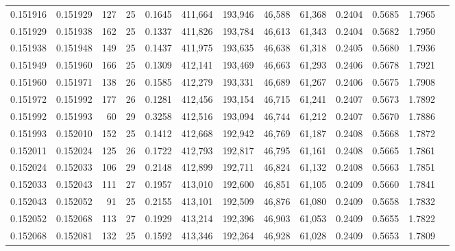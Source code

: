 \begin{tabular}{rrrrrrrrrrrrr}
0.151916 & 0.151929 & 127 &  25 &                                     0.1645 & 411,664 & 193,946 &  46,588 &  61,368 & 0.2404 & 0.5685 & 1.7965 \\
0.151929 & 0.151938 & 162 &  25 &                                     0.1337 & 411,826 & 193,784 &  46,613 &  61,343 & 0.2404 & 0.5682 & 1.7950 \\
0.151938 & 0.151948 & 149 &  25 &                                     0.1437 & 411,975 & 193,635 &  46,638 &  61,318 & 0.2405 & 0.5680 & 1.7936 \\
0.151949 & 0.151960 & 166 &  25 &                                     0.1309 & 412,141 & 193,469 &  46,663 &  61,293 & 0.2406 & 0.5678 & 1.7921 \\
0.151960 & 0.151971 & 138 &  26 &                                     0.1585 & 412,279 & 193,331 &  46,689 &  61,267 & 0.2406 & 0.5675 & 1.7908 \\
0.151972 & 0.151992 & 177 &  26 &                                     0.1281 & 412,456 & 193,154 &  46,715 &  61,241 & 0.2407 & 0.5673 & 1.7892 \\
0.151992 & 0.151993 &  60 &  29 &                                     0.3258 & 412,516 & 193,094 &  46,744 &  61,212 & 0.2407 & 0.5670 & 1.7886 \\
0.151993 & 0.152010 & 152 &  25 &                                     0.1412 & 412,668 & 192,942 &  46,769 &  61,187 & 0.2408 & 0.5668 & 1.7872 \\
0.152011 & 0.152024 & 125 &  26 &                                     0.1722 & 412,793 & 192,817 &  46,795 &  61,161 & 0.2408 & 0.5665 & 1.7861 \\
0.152024 & 0.152033 & 106 &  29 &                                     0.2148 & 412,899 & 192,711 &  46,824 &  61,132 & 0.2408 & 0.5663 & 1.7851 \\
0.152033 & 0.152043 & 111 &  27 &                                     0.1957 & 413,010 & 192,600 &  46,851 &  61,105 & 0.2409 & 0.5660 & 1.7841 \\
0.152043 & 0.152052 &  91 &  25 &                                     0.2155 & 413,101 & 192,509 &  46,876 &  61,080 & 0.2409 & 0.5658 & 1.7832 \\
0.152052 & 0.152068 & 113 &  27 &                                     0.1929 & 413,214 & 192,396 &  46,903 &  61,053 & 0.2409 & 0.5655 & 1.7822 \\
0.152068 & 0.152081 & 132 &  25 &                                     0.1592 & 413,346 & 192,264 &  46,928 &  61,028 & 0.2409 & 0.5653 & 1.7809 \\

\end{tabular}
